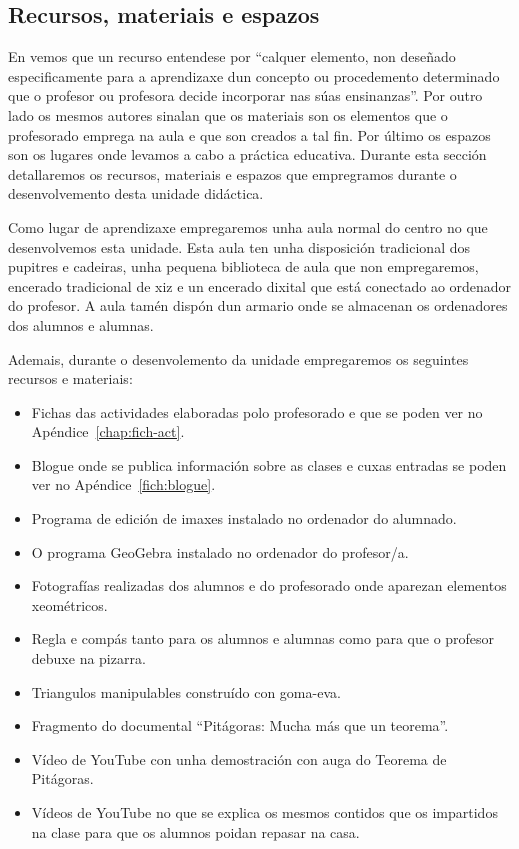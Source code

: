 \subsection{Recursos, materiais e espazos}\label{sec:recursos}

En  vemos que un recurso entendese por ``calquer elemento, non deseñado especificamente para a aprendizaxe dun concepto ou procedemento determinado que o profesor ou profesora decide incorporar nas súas ensinanzas''. Por outro lado os mesmos autores sinalan que os materiais son os elementos que o profesorado emprega na aula e que son creados a tal fin. Por último os espazos son os lugares onde levamos a cabo a práctica educativa. Durante esta sección detallaremos os recursos, materiais e espazos que empregramos durante o desenvolvemento desta unidade didáctica.

Como lugar de aprendizaxe empregaremos unha aula normal do centro no que desenvolvemos esta unidade. Esta aula ten unha disposición tradicional dos pupitres e cadeiras, unha pequena biblioteca de aula que non empregaremos, encerado tradicional de xiz e un encerado dixital que está conectado ao ordenador do profesor. A aula tamén dispón dun armario onde se almacenan os ordenadores dos alumnos e alumnas.

Ademais, durante o desenvolemento da unidade empregaremos os seguintes recursos e materiais:

\begin{itemize}
    \item Fichas das actividades elaboradas polo profesorado e que se poden ver no Apéndice~\ref{chap:fich-act}.
    \item Blogue onde se publica información sobre as clases e cuxas entradas se poden ver no Apéndice~\ref{fich:blogue}.
    \item Programa de edición de imaxes instalado no ordenador do alumnado.
    \item O programa GeoGebra instalado no ordenador do profesor/a.
    \item Fotografías realizadas dos alumnos e do profesorado onde aparezan elementos xeométricos.
    \item Regla e compás tanto para os alumnos e alumnas como para que o profesor debuxe na pizarra.
    \item Triangulos manipulables construído con goma-eva.
    \item Fragmento do documental ``Pitágoras: Mucha más que un teorema''.
    \item Vídeo de YouTube con unha demostración con auga do Teorema de Pitágoras.
    \item Vídeos de YouTube no que se explica os mesmos contidos que os impartidos na clase para que os alumnos poidan repasar na casa.
\end{itemize}
